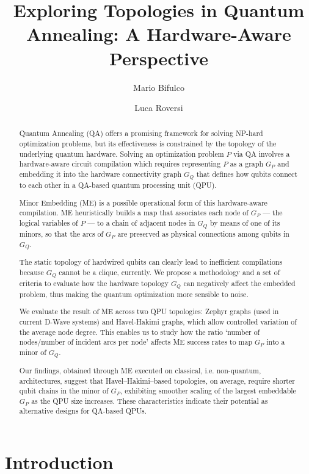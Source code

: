 \documentclass[11pt,acmsmall,nonacm]{acmart}
\title{Exploring Topologies in Quantum Annealing: A Hardware-Aware Perspective}
\author{Mario Bifulco}
\affiliation{%
  \institution{University of Turin}
  \city{Turin}
  \country{Italy}}
\author{Luca Roversi}
\affiliation{%
  \institution{University of Turin}
  \city{Turin}
  \country{Italy}}
\begin{document}
\begin{abstract}
  Quantum Annealing (QA) offers a promising framework for solving NP-hard optimization problems, but its effectiveness is constrained by the topology of the underlying quantum hardware. Solving an optimization problem $P$ via QA involves a hardware-aware circuit compilation which requires representing $P$ as a graph $G_P$ and embedding it into the hardware connectivity graph $G_Q$ that defines how qubits connect to each other in a QA-based quantum processing unit (QPU).

  Minor Embedding (ME) is a possible operational form of this hardware-aware compilation. ME heuristically builds a map that associates each node of $G_P$ --- the logical variables of $P$ --- to a chain of adjacent nodes in $G_Q$ by means of one of its minors, so that the arcs of $G_P$ are preserved as physical connections among qubits in $G_Q$.

  The static topology of hardwired qubits can clearly lead to inefficient compilations because $G_Q$ cannot be a clique, currently. We propose a methodology and a set of criteria to evaluate how the hardware topology $G_Q$ can negatively affect the embedded problem, thus making the quantum optimization more sensible to noise.

  We evaluate the result of ME across two QPU topologies: Zephyr graphs (used in current D-Wave systems) and Havel-Hakimi graphs, which allow controlled variation of the average node degree. This enables us to study how the ratio `number of nodes/number of incident arcs per node' affects ME success rates to map $G_P$ into a minor of $G_Q$.

  Our findings, obtained through ME executed on classical, i.e. non-quantum, architectures, suggest that Havel–Hakimi–based topologies, on average, require shorter qubit chains in the minor of $G_P$, exhibiting smoother scaling of the largest embeddable $G_P$ as the QPU size increases. These characteristics indicate their potential as alternative designs for QA-based QPUs.
\end{abstract}

\maketitle

\section{Introduction}
\end{document}
